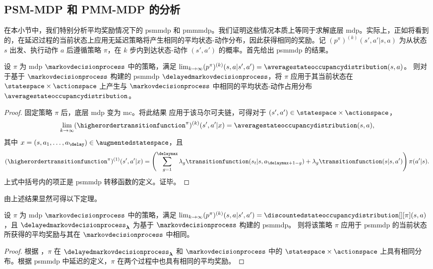 \subsection{PSM-MDP 和 PMM-MDP 的分析}
\label{subsec:analysis_psmmdp_pmmmdp}

在本小节中，我们特别分析平均奖励情况下的 \gls{psmmdp} 和 \gls{pmmmdp}。我们证明这些情况本质上等同于求解底层 \gls{mdp}。实际上，正如将看到的，在延迟过程的当前状态上应用无延迟策略将产生相同的平均状态-动作分布，因此获得相同的奖励。记 $(p^\pi)^{(k)}(s',a'\vert s,a)$ 为从状态 $s$ 出发、执行动作 $a$ 后遵循策略 $\pi$，在 $k$ 步内到达状态-动作 $(s',a')$ 的概率。首先给出 \gls{psmmdp} 的结果。

\begin{lemma}
\label{lem:same_distrib_psmmdp}
    设 $\pi$ 为 \gls{mdp} $\markovdecisionprocess$ 中的策略，满足 $\textstyle\lim_{k\rightarrow\infty}(p^\pi)^{(k)}(s,a\vert s',a')= \averagestateoccupancydistribution(s,a)$。
    则对于基于 $\markovdecisionprocess$ 构建的 \gls{psmmdp} $\delayedmarkovdecisionprocess$，将 $\pi$ 应用于其当前状态在 $\statespace\times\actionspace$ 上产生与 $\markovdecisionprocess$ 中相同的平均状态-动作占用分布 $\averagestateoccupancydistribution$。
\end{lemma}
\begin{proof}
    固定策略 $\pi$ 后，底层 \gls{mdp} 变为 \gls{mc}。将此结果 \cite[Theorem~2.1]{adke1988limit} 应用于该马尔可夫链，可得对于 $(s',a')\in\statespace\times\actionspace$，
    \begin{align*}
        \lim_{k\rightarrow\infty}(\higherordertransitionfunction^\pi)^{(k)}(s',a' \vert x) = \averagestateoccupancydistribution(s,a),
    \end{align*}
    其中 $x=(s,a_1,\dots,a_\delay)\in\augmentedstatespace$，且
    \begin{align*}
        (\higherordertransitionfunction^\pi)^{(1)}(s',a' \vert x)= \left(\sum_{g=1}^{\delaymax} \lambda_g \transitionfunction(s_t\vert s,a_{\delaymax+1-g}) + \lambda_g \transitionfunction(s\vert s,a')\right)\pi(a'\vert s).
    \end{align*}
    上式中括号内的项正是 \gls{psmmdp} 转移函数的定义。证毕。
\end{proof}

由上述结果显然可得以下定理。
\begin{thm}
\label{th:psmmdp_same}
    设 $\pi$ 为 \gls{mdp} $\markovdecisionprocess$ 中的策略，满足 $\lim_{k\rightarrow\infty}(p^\pi)^{(k)}(s,a\vert s',a')= \discountedstateoccupancydistribution[][\pi](s,a)$，且 $\delayedmarkovdecisionprocess_{\boldsymbol{\lambda}}$ 为基于 $\markovdecisionprocess$ 构建的 \gls{psmmdp}。
    则将该策略 $\pi$ 应用于 \gls{psmmdp} 的当前状态所获得的平均奖励与其在 $\markovdecisionprocess$ 中相同。
\end{thm}
\begin{proof}
    根据 ，$\pi$ 在 $\delayedmarkovdecisionprocess_{\boldsymbol{\lambda}}$ 和 $\markovdecisionprocess$ 中的 $\statespace\times\actionspace$ 上具有相同分布。根据 \gls{psmmdp} 中延迟的定义，$\pi$ 在两个过程中也具有相同的平均奖励。
\end{proof}

